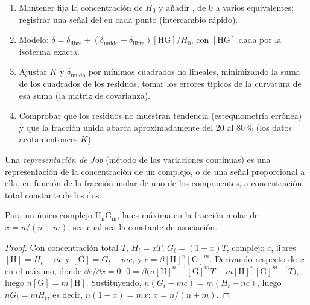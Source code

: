 \begin{method}\label{met:b3:supramolecular:nmr-titration}
\begin{enumerate}
  \item Mantener fija la concentración de  $H_0$ y añadir , de 0 a varios
        equivalentes; registrar una señal del  en cada punto (intercambio rápido).
  \item Modelo: $\delta = \delta_{\mathrm{libre}} + (\delta_{\mathrm{unido}} - \delta_{\mathrm{libre}})[\mathrm{HG}]/H_0$, con $[\mathrm{HG}]$ dada por la isoterma exacta.
  \item Ajustar $K$ y $\delta_{\mathrm{unido}}$ por mínimos cuadrados no lineales, minimizando la suma de los cuadrados
        de los residuos; tomar los errores típicos de la curvatura de esa suma
        (la matriz de covarianza).
  \item Comprobar que los residuos no muestran tendencia (estequiometría errónea) y que la
        fracción unida abarca aproximadamente del 20 al 80\,\% (los datos acotan entonces $K$).
\end{enumerate}
\end{method}

\begin{definition}\label{def:b3:supramolecular:job}
Una \emph{representación de Job} (método de las variaciones continuas) es una representación de
la concentración de un complejo, o de una señal proporcional a ella, en función de
la fracción molar de uno de los componentes, a concentración total constante de los
dos.
\end{definition}

\begin{proposition}\label{prop:b3:supramolecular:job}
Para un único complejo $\mathrm{H_nG_m}$, la  es máxima en la fracción molar de 
$x = n/(n + m)$, sea cual sea la constante de asociación.
\end{proposition}

\begin{proof}
Con concentración total $T$, $H_t = xT$, $G_t = (1 - x)T$, complejo $c$, libres $[\mathrm H] = H_t - nc$ y
$[\mathrm G] = G_t - mc$, y $c = \beta[\mathrm H]^n[\mathrm G]^m$. Derivando respecto de $x$ en el máximo, donde
$\dd c/\dd x = 0$: $0 = \beta\bigl(n[\mathrm H]^{n-1}[\mathrm G]^m T - m[\mathrm H]^n[\mathrm G]^{m-1}T\bigr)$, luego $n[\mathrm G] = m[\mathrm H]$. Sustituyendo,
$n(G_t - mc) = m(H_t - nc)$, luego $nG_t = mH_t$, es decir, $n(1 - x) = mx$: $x = n/(n + m)$.
\end{proof}

